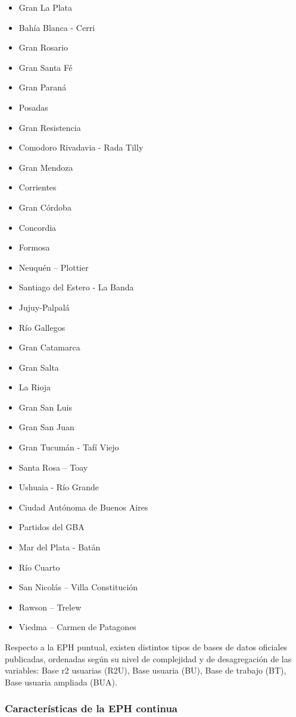 \documentclass[
]{article}
\providecommand{\tightlist}{%
  \setlength{\itemsep}{0pt}\setlength{\parskip}{0pt}}
\begin{document}
\begin{itemize}
\tightlist
\item
  Gran La Plata
\item
  Bahía Blanca - Cerri
\item
  Gran Rosario
\item
  Gran Santa Fé
\item
  Gran Paraná
\item
  Posadas
\item
  Gran Resistencia
\item
  Comodoro Rivadavia - Rada Tilly
\item
  Gran Mendoza
\item
  Corrientes
\item
  Gran Córdoba
\item
  Concordia
\item
  Formosa
\item
  Neuquén -- Plottier
\item
  Santiago del Estero - La Banda
\item
  Jujuy-Palpalá
\item
  Río Gallegos
\item
  Gran Catamarca
\item
  Gran Salta
\item
  La Rioja
\item
  Gran San Luis
\item
  Gran San Juan
\item
  Gran Tucumán - Tafí Viejo
\item
  Santa Rosa -- Toay
\item
  Ushuaia - Río Grande
\item
  Ciudad Autónoma de Buenos Aires
\item
  Partidos del GBA
\item
  Mar del Plata - Batán
\item
  Río Cuarto
\item
  San Nicolás -- Villa Constitución
\item
  Rawson -- Trelew
\item
  Viedma -- Carmen de Patagones
\end{itemize}

Respecto a la EPH puntual, existen distintos tipos de bases de datos oficiales publicadas, ordenadas según su nivel de complejidad y de desagregación de las variables: Base r2 usuarias (R2U), Base usuaria (BU), Base de trabajo (BT), Base usuaria ampliada (BUA).

\hypertarget{caracteruxedsticas-de-la-eph-continua}{%
\subsubsection{Características de la EPH continua}\label{caracteruxedsticas-de-la-eph-continua}}
\end{document}
